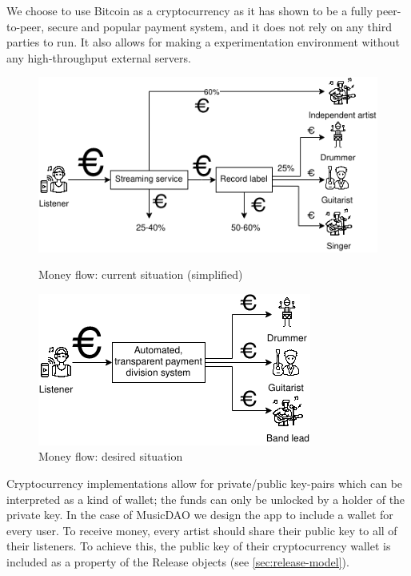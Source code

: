 We choose to use Bitcoin as a cryptocurrency as it has shown to be a fully peer-to-peer, secure and popular payment system, and it does not rely on any third parties to run. It also allows for making a experimentation environment without any high-throughput external servers. 

\begin{figure}
        \includegraphics[width=\linewidth]{design/current-money-flow-2.png}
        \caption{Money flow: current situation (simplified)}
        \label{fig:current-money-flow}
    \endminipage\hfill
        \includegraphics[width=\linewidth]{design/desired-money-flow-2.png}
        \caption{Money flow: desired situation}
        \label{fig:desired-money-flow}
    \endminipage
\end{figure}
Cryptocurrency implementations allow for private/public key-pairs which can be interpreted as a kind of wallet; the funds can only be unlocked by a holder of the private key. In the case of MusicDAO we design the app to include a wallet for every user. To receive money, every artist should share their public key to all of their listeners. To achieve this, the public key of their cryptocurrency wallet is included as a property of the Release objects (see \ref{sec:release-model}).

